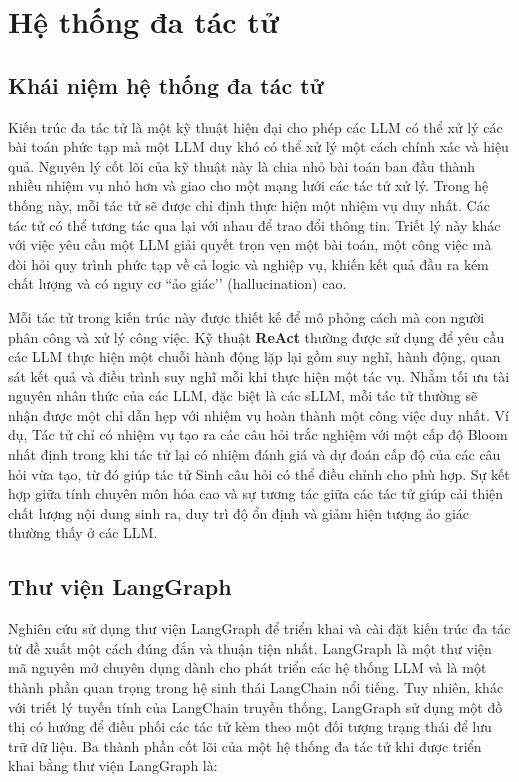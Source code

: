 \section{Hệ thống đa tác tử}

\subsection{Khái niệm hệ thống đa tác tử}

Kiến trúc đa tác tử là một kỹ thuật hiện đại cho phép các LLM có thể xử lý các bài toán phức tạp mà một LLM duy khó có thể xử lý một cách chính xác và hiệu quả. Nguyên lý cốt lõi của kỹ thuật này là chia nhỏ bài toán ban đầu thành nhiều nhiệm vụ nhỏ hơn và giao cho một mạng lưới các tác tử xử lý. Trong hệ thống này, mỗi tác tử sẽ được chỉ định thực hiện một nhiệm vụ duy nhất. Các tác tử có thể tương tác qua lại với nhau để trao đổi thông tin. Triết lý này khác với việc yêu cầu một LLM giải quyết trọn vẹn một bài toán, một công việc mà đòi hỏi quy trình phức tạp về cả logic và nghiệp vụ, khiến kết quả đầu ra kém chất lượng và có nguy cơ ``ảo giác’’ (hallucination) cao.

Mỗi tác tử trong kiến trúc này được thiết kế để mô phỏng cách mà con người phân công và xử lý công việc. Kỹ thuật \textbf{ReAct} \cite{yao2022react} thường được sử dụng để yêu cầu các LLM thực hiện một chuỗi hành động lặp lại gồm suy nghĩ, hành động, quan sát kết quả và điều trình suy nghĩ mỗi khi thực hiện một tác vụ. Nhằm tối ưu tài nguyên nhân thức của các LLM, đặc biệt là các sLLM, mỗi tác tử thường sẽ nhận được một chỉ dẫn hẹp với nhiệm vụ hoàn thành một công việc duy nhất. Ví dụ, Tác tử  chỉ có nhiệm vụ tạo ra các câu hỏi trắc nghiệm với một cấp độ Bloom nhất định trong khi tác tử  lại có nhiệm đánh giá và dự đoán cấp độ của các câu hỏi vừa tạo, từ đó giúp tác tử {Sinh câu hỏi} có thể điều chỉnh cho phù hợp. Sự kết hợp giữa tính chuyên môn hóa cao và sự tương tác giữa các tác tử giúp cải thiện chất lượng nội dung sinh ra, duy trì độ ổn định và giảm hiện tượng ảo giác thường thấy ở các LLM.

\subsection{Thư viện LangGraph}

Nghiên cứu sử dụng thư viện LangGraph để triển khai và cài đặt kiến trúc đa tác từ đề xuất  một cách đúng đắn và thuận tiện nhất. LangGraph là một thư viện mã nguyên mở chuyên dụng dành cho phát triển các hệ thống LLM và là một thành phần quan trọng trong hệ sinh thái LangChain nổi tiếng. Tuy nhiên, khác với triết lý tuyến tính của LangChain truyền thống, LangGraph sử dụng một đồ thị có hướng để điều phối các tác tử kèm theo một đối tượng trạng thái để lưu trữ dữ liệu. Ba thành phần cốt lõi của một hệ thống đa tác tử khi được triển khai bằng thư viện LangGraph là:

